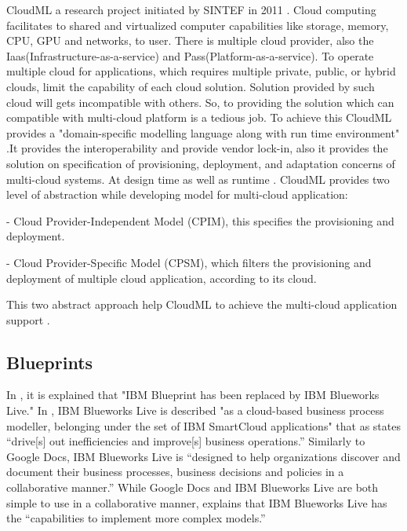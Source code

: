{     CloudML a research project initiated by SINTEF in 2011
     \cite{www-cloudml}. Cloud computing facilitates to shared
     and virtualized computer capabilities like storage, memory,
     CPU, GPU and networks, to user. There is multiple cloud provider,
     also the Iaas(Infrastructure-as-a-service) and
     Pass(Platform-as-a-service). To operate multiple cloud for
     applications, which requires multiple private, public, or hybrid
     clouds, limit the capability of each cloud solution.  Solution
     provided by such cloud will gets incompatible with others. So,
     to providing the solution which can compatible with multi-cloud
     platform is a tedious job. To achieve this CloudML provides a
     "domain-specific modelling language along with run time environment"
     \cite{www-cloudml}.It provides the interoperability and provide
     vendor lock-in, also it provides the solution on specification of
     provisioning, deployment, and adaptation concerns of multi-cloud
     systems. At design time as well as runtime \cite{www-cloudml}.
     CloudML provides two level of abstraction while developing model
     for multi-cloud application:

     - Cloud Provider-Independent Model (CPIM), this specifies the
       provisioning and deployment.
       
     - Cloud Provider-Specific Model (CPSM), which filters the
       provisioning and deployment of multiple cloud application,
       according to its cloud.

     This two abstract approach help CloudML to achieve the multi-cloud 
     application support \cite{www-cloudmlwiki}.

\subsection{Blueprints \cv}

     In \cite{www-blueprints}, it is explained that "IBM Blueprint 
     has been replaced by IBM Blueworks Live." In 
     \cite{www-blueworks-live2}, IBM Blueworks Live is described "as 
     a cloud-based business process modeller, belonging under the set 
     of IBM SmartCloud applications" that as 
     \cite{www-blueworks-live} states ``drive[s] out inefficiencies 
     and improve[s] business operations.'' Similarly to Google Docs, 
     IBM Blueworks Live is ``designed to help organizations discover 
     and document their business processes, business decisions and 
     policies in a collaborative manner.'' While Google Docs and IBM 
     Blueworks Live are both simple to use in a collaborative manner, 
     \cite{www-blueworks-live2} explains that IBM Blueworks Live 
     has the ``capabilities to implement more complex models.''

}
